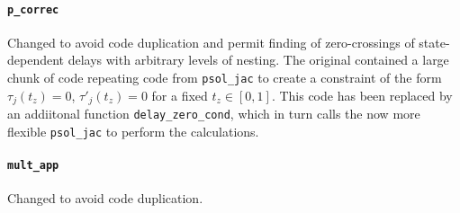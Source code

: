 \documentclass[11pt]{scrartcl}
\newcommand{\blist}[1]{\mbox{\lstinline!#1!}}
\begin{document}
\paragraph{\blist{p_correc}} Changed to avoid code duplication and
permit finding of zero-crossings of state-dependent delays with
arbitrary levels of nesting. The original contained a large chunk of
code repeating code from \blist{psol_jac} to create a constraint of
the form $\tau_j(t_z)=0$, $\tau'_j(t_z)=0$ for a fixed
$t_z\in[0,1]$. This code has been replaced by an addiitonal function
\blist{delay_zero_cond}, which in turn calls the now more flexible
\blist{psol_jac} to perform the calculations.

\paragraph{\blist{mult_app}}Changed to avoid code duplication.
\end{document}
